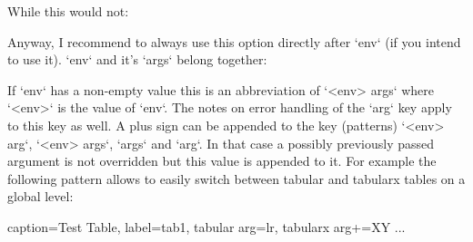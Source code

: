   \begin{examplecode}
  \end{examplecode}

  While this would not:

  \begin{examplecode}
  \end{examplecode}

  Anyway, I recommend to always use this option directly after `env` (if you intend to use it).
  `env` and it's `args` belong together:

  \begin{examplecode}
  \end{examplecode}

  If `env` has a non-empty value this is an abbreviation of `<env> args` where `<env>` is the value of `env`.
  The notes on error handling of the `arg` key apply to this key as well.
  A plus sign can be appended to the key (patterns) `<env> arg`, `<env> args`, `args` and `arg`.
  In that case a possibly previously passed argument is not overridden but this value is appended to it.
  For example the following pattern allows to easily switch between tabular and tabularx tables on a global level:

  \begin{examplecode}

  \begin{tableobject}{caption=Test Table, label=tab1, tabular arg=lr, tabularx arg+=XY}
      ...
  \end{tableobject}
  \end{examplecode}

\bigpar

